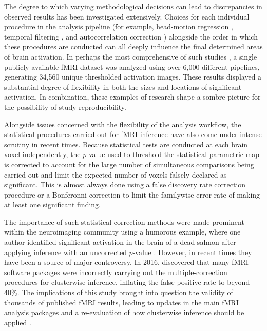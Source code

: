 The degree to which varying methodological decisions can lead to discrepancies in observed results has been investigated extensively. Choices for each individual procedure in the analysis pipeline (for example, head-motion regression \citep{Lund2005-sf}, temporal filtering \citep{Skudlarski1999-ao}, and autocorrelation correction \citep{Woolrich2001-tk}) alongside the order in which these procedures are conducted \citep{Carp2013-cm} can all deeply influence the final determined areas of brain activation. In perhaps the most comprehensive of such studies \citep{Carp2012-ph}, a single publicly available fMRI dataset was analyzed using over 6,000 different pipelines, generating 34,560 unique thresholded activation images. These results displayed a substantial degree of flexibility in both the sizes and locations of significant activation. In combination, these examples of research shape a sombre picture for the possibility of study reproducibility. 

Alongside issues concerned with the flexibility of the analysis workflow, the statistical procedures carried out for fMRI inference have also come under intense scrutiny in recent times. Because statistical tests are conducted at each brain voxel independently, the $p$-value used to threshold the statistical parametric map is corrected to account for the large number of simultaneous comparisons being carried out and limit the expected number of voxels falsely declared as significant. This is almost always done using a false discovery rate correction procedure \citep{Benjamini1995-yy} or a Bonferonni correction to limit the familywise error rate of making at least one significant finding. 

The importance of such statistical correction methods were made prominent within the neuroimaging community using a humorous example, where one author identified significant activation in the brain of a dead salmon after applying inference with an uncorrected $p$-value \citep{Bennett2009-fh}. However, in recent times they have been a source of major controversy. In 2016, \citet*{Eklund2016-ak} discovered that many fMRI software packages were incorrectly carrying out the multiple-correction procedures for clusterwise inference, inflating the false-positive rate to beyond 40\%. The implications of this study brought into question the validity of thousands of published fMRI results, leading to updates in the main fMRI analysis packages \citep{Cox2017-wr} and a re-evaluation of how clusterwise inference should be applied \citep{Flandin2019-qx, Mueller2017-pn, Cox2017-ys}. 

